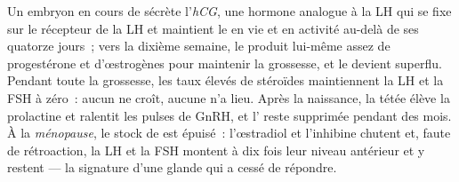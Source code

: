 \begin{proposition}\label{prop:b2:reproductive-hormones:overrides}
Un embryon en cours de  sécrète l'\emph{hCG}, une hormone
analogue à la LH qui se fixe sur le récepteur de la LH et maintient le
 en vie et en activité au-delà de ses quatorze jours~; vers
la dixième semaine, le  produit lui-même assez de progestérone
et d'œstrogènes pour maintenir la grossesse, et le  devient
superflu. Pendant toute la grossesse, les taux élevés de stéroïdes
maintiennent la LH et la FSH à zéro~: aucun  ne croît, aucune
 n'a lieu. Après la naissance, la tétée élève la prolactine et
ralentit les pulses de GnRH, et l' reste supprimée pendant des
mois. À la \emph{ménopause}, le stock de  est épuisé~:
l'œstradiol et l'inhibine chutent et, faute de rétroaction, la LH et la
FSH montent à dix fois leur niveau antérieur et y restent --- la
signature d'une glande qui a cessé de répondre.
\end{proposition}

